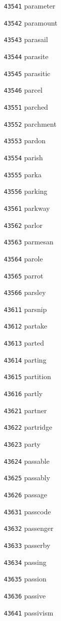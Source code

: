 \documentclass[twoside,11pt]{article}
\begin{document}
\begin{multicols}{5}
\begin{enumerate}
\item[\texttt{43541}] parameter
\item[\texttt{43542}] paramount
\item[\texttt{43543}] parasail
\item[\texttt{43544}] parasite
\item[\texttt{43545}] parasitic
\item[\texttt{43546}] parcel
\item[\texttt{43551}] parched
\item[\texttt{43552}] parchment
\item[\texttt{43553}] pardon
\item[\texttt{43554}] parish
\item[\texttt{43555}] parka
\item[\texttt{43556}] parking
\item[\texttt{43561}] parkway
\item[\texttt{43562}] parlor
\item[\texttt{43563}] parmesan
\item[\texttt{43564}] parole
\item[\texttt{43565}] parrot
\item[\texttt{43566}] parsley
\item[\texttt{43611}] parsnip
\item[\texttt{43612}] partake
\item[\texttt{43613}] parted
\item[\texttt{43614}] parting
\item[\texttt{43615}] partition
\item[\texttt{43616}] partly
\item[\texttt{43621}] partner
\item[\texttt{43622}] partridge
\item[\texttt{43623}] party
\item[\texttt{43624}] passable
\item[\texttt{43625}] passably
\item[\texttt{43626}] passage
\item[\texttt{43631}] passcode
\item[\texttt{43632}] passenger
\item[\texttt{43633}] passerby
\item[\texttt{43634}] passing
\item[\texttt{43635}] passion
\item[\texttt{43636}] passive
\item[\texttt{43641}] passivism

\end{enumerate}
\end{multicols}
\end{document}
